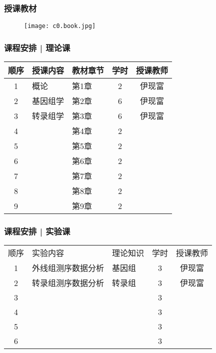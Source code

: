 \begin{frame}
\end{frame}

\begin{frame}
  \frametitle{授课教材}
  \begin{figure}
    \centering
    \texttt{[image: c0.book.jpg]}
  \end{figure}
\end{frame}

\begin{frame}
  \frametitle{课程安排 | 理论课}
  \begin{table}
    \centering
    \begin{tabular}{cllcc}
      \hline
      \rowcolor{blue!50}顺序 & 授课内容 & 教材章节 & 学时 & 授课教师\\
      \hline
      1 & 概论 & 第1章 & 2 & 伊现富\\
      2 & 基因组学 & 第2章 & 6 & 伊现富\\
      3 & 转录组学 & 第3章 & 6 & 伊现富\\
      4 &  & 第4章 & 2 & \\
      5 &  & 第5章 & 2 & \\
      6 &  & 第6章 & 2 & \\
      7 &  & 第7章 & 2 & \\
      8 &  & 第8章 & 2 & \\
      9 &  & 第9章 & 2 & \\
      \hline
    \end{tabular}
  \end{table}
\end{frame}

\begin{frame}
  \frametitle{课程安排 | 实验课}
  \begin{table}
    \centering
    \begin{tabular}{cllcc}
      \hline
      \rowcolor{blue!50}顺序 & 实验内容 & 理论知识 & 学时 & 授课教师\\
      1 & 外线组测序数据分析 & 基因组 & 3 & 伊现富\\
      2 & 转录组测序数据分析 & 转录组 & 3 & 伊现富\\
      3 & & & 3 & \\
      4 & & & 3 & \\
      5 & & & 3 & \\
      6 & & & 3 & \\
      \hline
    \end{tabular}
  \end{table}
\end{frame}


